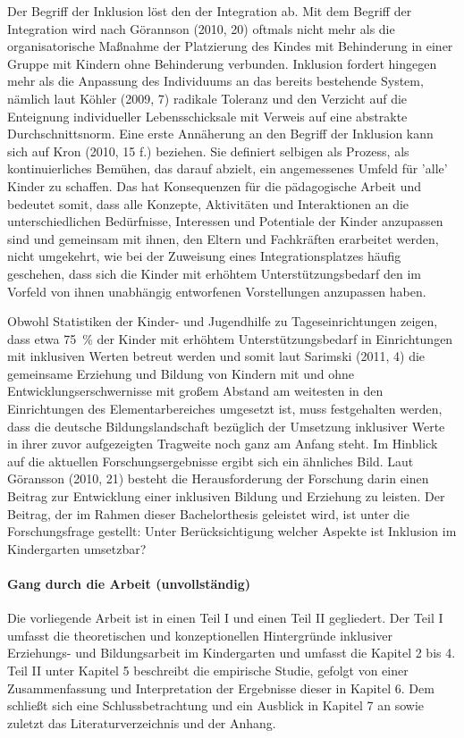 Der Begriff der Inklusion löst den der Integration ab. Mit dem Begriff der Integration wird nach Görannson (2010, 20) oftmals nicht mehr als die organisatorische Maßnahme der Platzierung des Kindes mit Behinderung in einer Gruppe mit Kindern ohne Behinderung verbunden. Inklusion fordert hingegen mehr als die Anpassung des Individuums an das bereits bestehende System, nämlich laut Köhler (2009, 7) radikale Toleranz und den Verzicht auf die Enteignung individueller Lebensschicksale mit Verweis auf eine abstrakte Durchschnittsnorm. Eine erste Annäherung an den Begriff der Inklusion kann sich auf Kron (2010, 15 f.) beziehen. Sie definiert selbigen als Prozess, als kontinuierliches Bemühen, das darauf abzielt, ein angemessenes Umfeld für ’alle’ Kinder zu schaffen. Das hat Konsequenzen für die pädagogische Arbeit und bedeutet somit, dass alle Konzepte, Aktivitäten und Interaktionen an die unterschiedlichen Bedürfnisse, Interessen und Potentiale der Kinder anzupassen sind und gemeinsam mit ihnen, den Eltern und Fachkräften erarbeitet werden, nicht umgekehrt, wie bei der Zuweisung eines Integrationsplatzes häufig geschehen, dass sich die Kinder mit erhöhtem Unterstützungsbedarf den im Vorfeld von ihnen unabhängig entworfenen Vorstellungen anzupassen haben.  

Obwohl Statistiken der Kinder- und Jugendhilfe zu Tageseinrichtungen zeigen, dass etwa 75~\% der Kinder mit erhöhtem Unterstützungsbedarf in Einrichtungen mit inklusiven Werten betreut werden und somit laut Sarimski (2011, 4) die gemeinsame Erziehung und Bildung von Kindern mit und ohne Entwicklungserschwernisse mit großem Abstand am weitesten in den Einrichtungen des Elementarbereiches umgesetzt ist, muss festgehalten werden, dass die deutsche Bildungslandschaft bezüglich der Umsetzung inklusiver Werte in ihrer zuvor aufgezeigten Tragweite noch ganz am Anfang steht. Im Hinblick auf die aktuellen Forschungsergebnisse ergibt sich ein ähnliches Bild. Laut Göransson (2010, 21) besteht die Herausforderung der Forschung darin einen Beitrag zur Entwicklung einer inklusiven Bildung und Erziehung zu leisten. Der Beitrag, der im Rahmen dieser Bachelorthesis geleistet wird, ist unter die Forschungsfrage gestellt: Unter Berücksichtigung welcher Aspekte ist Inklusion im Kindergarten umsetzbar?

\paragraph{Gang durch die Arbeit (unvollständig)} 
Die vorliegende Arbeit ist in einen Teil I und einen Teil II gegliedert. Der Teil I umfasst die theoretischen und konzeptionellen Hintergründe inklusiver Erziehungs- und Bildungsarbeit im Kindergarten und umfasst die Kapitel 2 bis 4. Teil II unter Kapitel 5 beschreibt die empirische Studie, gefolgt von einer Zusammenfassung und Interpretation der Ergebnisse dieser in Kapitel 6. Dem schließt sich eine Schlussbetrachtung und ein Ausblick in Kapitel 7 an sowie zuletzt das Literaturverzeichnis und der Anhang.

